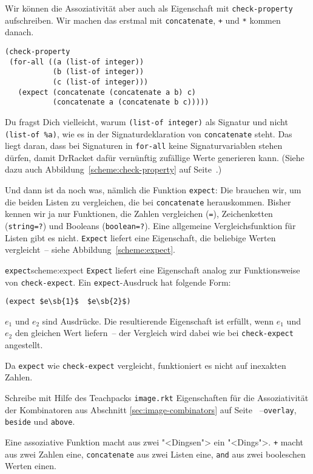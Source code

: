 Wir können die Assoziativität aber auch als Eigenschaft mit
\lstinline{check-property} aufschreiben.  Wir machen das erstmal mit
\lstinline{concatenate}, \lstinline{+} und \lstinline{*} kommen
danach.
%
\begin{lstlisting}
(check-property
 (for-all ((a (list-of integer))
           (b (list-of integer))
           (c (list-of integer)))
   (expect (concatenate (concatenate a b) c)
           (concatenate a (concatenate b c)))))
\end{lstlisting}
%
Du fragst Dich vielleicht, warum \lstinline{(list-of integer)} als
Signatur und nicht \lstinline{(list-of %a)},
wie es in der Signaturdeklaration von \lstinline{concatenate} steht.
Das liegt daran, dass bei Signaturen in \lstinline{for-all} keine
Signaturvariablen stehen dürfen, damit DrRacket dafür vernünftig
zufällige Werte generieren kann.  (Siehe dazu auch
Abbildung~\ref{scheme:check-property} auf
Seite~\pageref{scheme:check-property}.)

Und dann ist da noch was, nämlich die Funktion \lstinline{expect}: Die
brauchen wir, um die beiden Listen zu vergleichen, die bei
\lstinline{concatenate} herauskommen.  Bisher kennen wir ja nur
Funktionen, die Zahlen vergleichen (\lstinline{=}), Zeichenketten
(\lstinline{string=?}) und Booleans (\lstinline{boolean=?}).  Eine
allgemeine Vergleichsfunktion für Listen gibt es nicht.
\lstinline{Expect} liefert eine Eigenschaft, die beliebige Werten
vergleicht~-- siehe Abbildung~\ref{scheme:expect}.
%
\begin{feature}{\lstinline{expect}}{scheme:expect}
  \lstinline{Expect} liefert eine
  Eigenschaft analog zur Funktionsweise von
  \lstinline{check-expect}.  Ein \lstinline{expect}-Ausdruck hat folgende
  Form:
\begin{lstlisting}
(expect $e\sb{1}$  $e\sb{2}$)
\end{lstlisting}
%
$e_1$ und $e_2$ sind Ausdrücke.  Die resultierende Eigenschaft ist
erfüllt, wenn $e_1$ und $e_2$ den gleichen Wert liefern~-- der
Vergleich wird dabei wie bei \lstinline{check-expect} angestellt.

Da \lstinline{expect} wie \lstinline{check-expect} vergleicht,
funktioniert es nicht auf inexakten Zahlen.
\end{feature}
%
\begin{aufgabeinline}
  Schreibe mit Hilfe des Teachpacks \texttt{image.rkt} Eigenschaften
  für die Assoziativität der Kombinatoren aus Abschnitt
  \ref{sec:image-combinators} auf Seite \pageref{sec:image-combinators}~--\lstinline{overlay},
  \lstinline{beside} und \lstinline{above}.
\end{aufgabeinline}
%
Eine assoziative Funktion macht aus zwei "<Dingsen"> ein
"<Dings">.  \lstinline{+} macht aus zwei Zahlen eine,
\lstinline{concatenate} aus zwei Listen eine, \lstinline{and} aus zwei
booleschen Werten einen.

